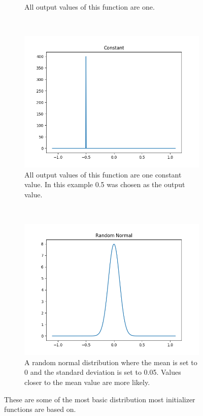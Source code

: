 \begin{figure}[h!]
\begin{subfigure}[t]{0.4\textwidth}
		\caption{All output values of this function are one.}
	\end{subfigure}
	~
	\begin{subfigure}[t]{0.4\textwidth}
		\centering
		\includegraphics[width=\textwidth]{img/methodology_neuralNetwork_initializerFunctions_constant.png}
		\caption{All output values of this function are one constant value. In this example 0.5 was chosen as the output value.}
	\end{subfigure}%
	~ 
	\begin{subfigure}[t]{0.4\textwidth}
		\centering
		\includegraphics[width=\textwidth]{img/methodology_neuralNetwork_initializerFunctions_randomNormal.png}
		\caption{A random normal distribution where the mean is set to 0 and the standard deviation is set to 0.05. Values closer to the mean value are more likely.}
	\end{subfigure}
	\caption{These are some of the most basic distribution most initializer functions are based on.}
	\label{pic:methodology_neuralNetwork_initializerFunctions1}
\end{figure}

